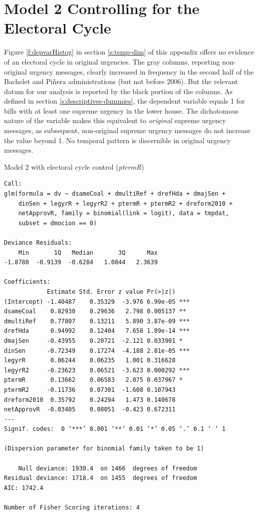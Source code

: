 \documentclass[letter,12pt]{article}
\begin{document}
\section{Model 2 Controlling for the Electoral Cycle}

Figure \ref{f:depvarHistog} in section \ref{s:temp-dim} of this appendix offers no evidence of an electoral cycle in original urgencies. The gray columns, reporting non-original urgency messages, clearly increased in frequency in the second half of the Bachelet and Piñera administrations (but not before 2006). But the relevant datum for our analysis is reported by the black portion of the columns. As defined in section \ref{s:descriptives-dummies}, the dependent variable equals 1 for bills with at least one supreme urgency in the lower house. The dichotomous nature of the variable makes this equivalent to \emph{original} supreme urgency messages, as subsequent, non-original supreme urgency messages do not increase the value beyond 1. No temporal pattern is discernible in original urgency messages.

\begin{table}
  \begin{footnotesize}
\caption{Model 2 with electoral cycle control (\emph{ptermR})}\label{t:m2elect}
\centering
\begin{verbatim}
Call:
glm(formula = dv ~ dsameCoal + dmultiRef + drefHda + dmajSen + 
    dinSen + legyrR + legyrR2 + ptermR + ptermR2 + dreform2010 + 
    netApprovR, family = binomial(link = logit), data = tmpdat, 
    subset = dmocion == 0)

Deviance Residuals: 
    Min       1Q   Median       3Q      Max  
-1.8788  -0.9139  -0.6284   1.0844   2.3639  

Coefficients:
            Estimate Std. Error z value Pr(>|z|)    
(Intercept) -1.40487    0.35329  -3.976 6.99e-05 ***
dsameCoal    0.82930    0.29636   2.798 0.005137 ** 
dmultiRef    0.77807    0.13211   5.890 3.87e-09 ***
drefHda      0.94992    0.12404   7.658 1.89e-14 ***
dmajSen     -0.43955    0.20721  -2.121 0.033901 *  
dinSen      -0.72349    0.17274  -4.188 2.81e-05 ***
legyrR       0.06244    0.06235   1.001 0.316628    
legyrR2     -0.23623    0.06521  -3.623 0.000292 ***
ptermR       0.13662    0.06583   2.075 0.037967 *  
ptermR2     -0.11736    0.07301  -1.608 0.107943    
dreform2010  0.35792    0.24294   1.473 0.140678    
netApprovR  -0.03405    0.08051  -0.423 0.672311    
---
Signif. codes:  0 ‘***’ 0.001 ‘**’ 0.01 ‘*’ 0.05 ‘.’ 0.1 ‘ ’ 1

(Dispersion parameter for binomial family taken to be 1)

    Null deviance: 1930.4  on 1466  degrees of freedom
Residual deviance: 1718.4  on 1455  degrees of freedom
AIC: 1742.4

Number of Fisher Scoring iterations: 4
\end{verbatim}
\end{footnotesize}
\end{table}
\end{document}
